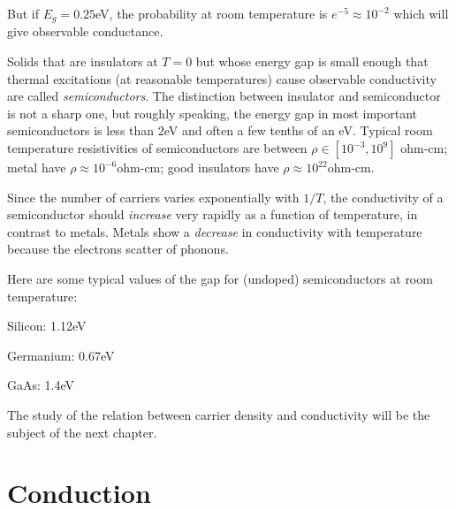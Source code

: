 \documentclass{Textbook}
\begin{document}
\noindent But if $E_g=0.25$eV, the probability at room temperature is $e^{-5}\approx 10^{-2}$ which will give observable conductance.

Solids that are insulators at $T=0$ but whose energy gap is small enough that thermal excitations (at reasonable temperatures) cause observable conductivity are called \emph{semiconductors}. The distinction between insulator and semiconductor is not a sharp one, but roughly speaking, the energy gap in most important semiconductors is less than $2$eV and often a few tenths of an eV. Typical room temperature resistivities of semiconductors are between $\rho \in [10^{-3},10^{9}]$ ohm-cm; metal have $\rho \approx 10^{-6}$ohm-cm; good insulators have $\rho\approx 10^{22}$ohm-cm.

Since the number of carriers varies exponentially with $1/T$, the conductivity of a semiconductor should \emph{increase} very rapidly as a function of temperature, in contrast to metals. Metals show a \emph{decrease} in conductivity with temperature because the electrons scatter of phonons.

\noindent Here are some typical values of the gap for (undoped) semiconductors at room temperature:

\noindent Silicon: 1.12eV

\noindent Germanium: 0.67eV

\noindent GaAs: 1.4eV

\noindent The study of the relation between carrier density and conductivity will be the subject of the next chapter.

\chapter{Conduction}
\end{document}
